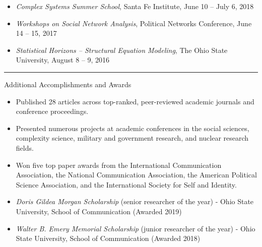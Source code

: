 \documentclass[letterpaper, 9pt]{extarticle}
\begin{document}
{\begin{itemize}[leftmargin=!,labelindent=-10pt,itemindent=0pt]
\vspace{-6pt}
\item \textit{Complex Systems Summer School}, Santa Fe Institute, June 10 -- July 6, 2018

\vspace{-6pt}
\item \textit{Workshops on Social Network Analysis}, Political Networks Conference, June 14 -- 15, 2017

\vspace{-6pt}
\item \textit{Statistical Horizons -- Structural Equation Modeling}, The Ohio State University, August 8 -- 9, 2016
\end{itemize}

\vspace{-7.5pt}

\rule{\textwidth}{0.25pt}
\raggedright

\vspace{-4pt}
\begin{center}
\large{Additional Accomplishments and Awards}
\end{center}

\begin{itemize}[leftmargin=!,labelindent=-10pt,itemindent=0pt]
\item Published 28 articles across top-ranked, peer-reviewed academic journals and conference proceedings.

\vspace{-6pt}
\item Presented numerous projects at academic conferences in the social sciences, complexity science, military and government research, and nuclear research fields.

\vspace{-6pt}
\item Won five top paper awards from the International Communication Association, the National Communication Association, the American Political Science Association, and the International Society for Self and Identity.

\vspace{-6pt}
\item \textit{Doris Gildea Morgan Scholarship} (senior researcher of the year) - Ohio State University, School of Communication (Awarded 2019)

\vspace{-6pt}
\item \textit{Walter B. Emery Memorial Scholarship} (junior researcher of the year) - Ohio State University, School of Communication (Awarded 2018)


\end{itemize}}
\end{document}
